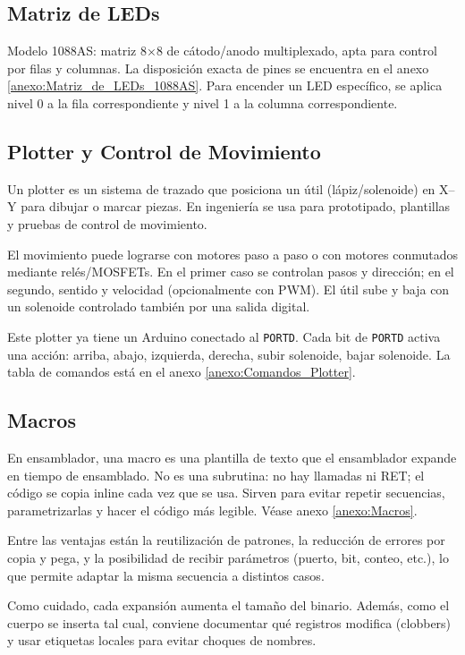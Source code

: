 \subsection{Matriz de LEDs}
Modelo 1088AS: matriz 8×8 de cátodo/anodo multiplexado, apta para control por filas y columnas. La disposición exacta de pines se encuentra en el anexo \ref{anexo:Matriz_de_LEDs_1088AS}. Para encender un LED específico, se aplica nivel 0 a la fila correspondiente y nivel 1 a la columna correspondiente.


\subsection{Plotter y Control de Movimiento}
Un plotter es un sistema de trazado que posiciona un útil (lápiz/solenoide) en X–Y para dibujar o marcar piezas. En ingeniería se usa para prototipado, plantillas y pruebas de control de movimiento.

El movimiento puede lograrse con motores paso a paso o con motores conmutados mediante relés/MOSFETs. En el primer caso se controlan pasos y dirección; en el segundo, sentido y velocidad (opcionalmente con PWM). El útil sube y baja con un solenoide controlado también por una salida digital.

Este plotter ya tiene un Arduino conectado al \texttt{PORTD}. Cada bit de \texttt{PORTD} activa una acción: arriba, abajo, izquierda, derecha, subir solenoide, bajar solenoide. La tabla de comandos está en el anexo \ref{anexo:Comandos_Plotter}.


\subsection{Macros}
En ensamblador, una macro es una plantilla de texto que el ensamblador expande en tiempo de ensamblado. No es una subrutina: no hay llamadas ni RET; el código se copia inline cada vez que se usa. Sirven para evitar repetir secuencias, parametrizarlas y hacer el código más legible. Véase anexo \ref{anexo:Macros}.

Entre las ventajas están la reutilización de patrones, la reducción de errores por copia y pega, y la posibilidad de recibir parámetros (puerto, bit, conteo, etc.), lo que permite adaptar la misma secuencia a distintos casos.

Como cuidado, cada expansión aumenta el tamaño del binario. Además, como el cuerpo se inserta tal cual, conviene documentar qué registros modifica (clobbers) y usar etiquetas locales para evitar choques de nombres.



